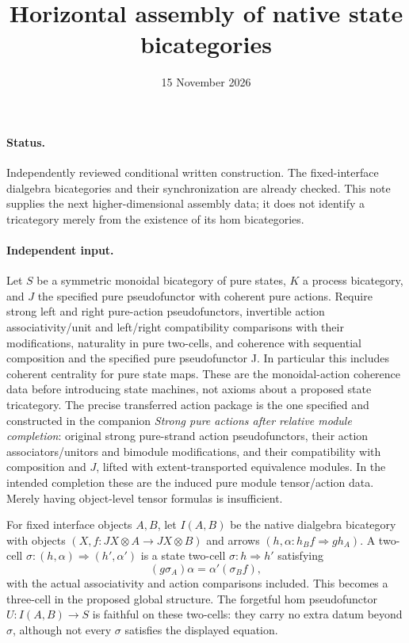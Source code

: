 \documentclass{article}
\title{Horizontal assembly of native state bicategories}
\date{15 November 2026}
\begin{document}
\maketitle
\paragraph{Status.} Independently reviewed conditional written construction. The fixed-interface dialgebra bicategories and their synchronization are already checked. This note supplies the next higher-dimensional assembly data; it does not identify a tricategory merely from the existence of its hom bicategories.

\paragraph{Independent input.} Let $S$ be a symmetric monoidal bicategory of pure states, $K$ a process bicategory, and $J$ the specified pure pseudofunctor with coherent pure actions. Require strong left and right pure-action pseudofunctors, invertible action associativity/unit and left/right compatibility comparisons with their modifications, naturality in pure two-cells, and coherence with sequential composition and the specified pure pseudofunctor J. In particular this includes coherent centrality for pure state maps. These are the monoidal-action coherence data before introducing state machines, not axioms about a proposed state tricategory. The precise transferred action package is the one specified and constructed in the companion \emph{Strong pure actions after relative module completion}: original strong pure-strand action pseudofunctors, their action associators/unitors and bimodule modifications, and their compatibility with composition and $J$, lifted with extent-transported equivalence modules. In the intended completion these are the induced pure module tensor/action data. Merely having object-level tensor formulas is insufficient.

For fixed interface objects $A,B$, let $I(A,B)$ be the native dialgebra bicategory with objects $(X,f:JX\otimes A\to JX\otimes B)$ and arrows $(h,\alpha:h_B f\Rightarrow g h_A)$. A two-cell $\sigma:(h,\alpha)\Rightarrow(h',\alpha')$ is a state two-cell $\sigma:h\Rightarrow h'$ satisfying
\[
 (g\sigma_A)\alpha=\alpha'(\sigma_B f),
\]
with the actual associativity and action comparisons included. This becomes a three-cell in the proposed global structure. The forgetful hom pseudofunctor $U:I(A,B)\to S$ is faithful on these two-cells: they carry no extra datum beyond $\sigma$, although not every $\sigma$ satisfies the displayed equation.
\end{document}
